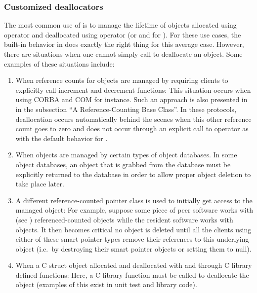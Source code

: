\documentclass[pdf,ps2pdf,11pt]{SANDreport}
\begin{document}
%
{}\subsubsection{Customized deallocators}
\label{sec:deallocators}
%

The most common use of {} is to manage the lifetime of
objects allocated using operator {} and deallocated using
operator {} (or {} and {} for {}).  For these use cases, the built-in
behavior in {} does exactly the right thing for this
average case.  However, there are situations when one cannot simply
call {} to deallocate an object.  Some examples of
these situations include:

\begin{enumerate}

{}\item When reference counts for objects are managed by requiring
clients to explicitly call increment and decrement functions: This
situation occurs when using CORBA {}\cite{ref:corba} and COM
{}\cite{ref:com} for instance.  Such an approach is also presented in
{}\cite[Item 29]{MoreEffectiveC++96} in the subsection ``A
Reference-Counting Base Class''.  In these protocols, deallocation
occurs automatically behind the scenes when this other reference count
goes to zero and does not occur through an explicit call to operator
{} as with the default behavior for {}.

{}\item When objects are managed by certain types of object databases.
In some object databases, an object that is grabbed from the database
must be explicitly returned to the database in order to allow proper
object deletion to take place later.

{}\item A different reference-counted pointer class is used to
initially get access to the managed object:  For example, suppose some
piece of peer software works with {} (see
{}\cite{ref:boost}) referenced-counted objects while the resident
software works with {} objects.  It then becomes critical no
object is deleted until all the clients using either of these smart
pointer types remove their references to this underlying object (i.e.\
by destroying their smart pointer objects or setting them to null).

{}\item When a C struct object allocated and deallocated with
{} and {} through C library defined
functions: Here, a C library function must be called to deallocate the
object (examples of this exist in unit test and library code).

\end{enumerate}
\end{document}

